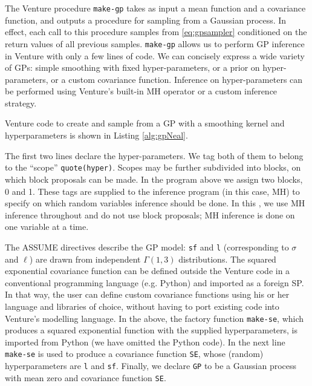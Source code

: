 The Venture procedure \texttt{make-gp} takes as input a mean function and a covariance function, and outputs a procedure for sampling from a Gaussian process.
In effect, each call to this procedure samples from \eqref{eq:gpsampler} conditioned on the return values of all previous samples.
\texttt{make-gp} allows us to perform GP inference in Venture with only a few lines of code.
We can concisely express a wide variety of GPs: simple smoothing with fixed hyper-parameters, or a prior on hyper-parameters, or a custom covariance function.
Inference on hyper-parameters can be performed using Venture's built-in MH operator or a custom inference strategy.

Venture code to create and sample from a GP with a smoothing kernel and hyperparameters is shown in Listing \ref{alg:gpNeal}.




The first two lines declare the hyper-parameters.
We tag both of them to belong to the ``scope'' \texttt{quote(hyper)}.
Scopes may be further subdivided into blocks, on which block proposals can be made. In the program above we assign two blocks, 0 and 1. These tags are supplied to the inference program (in this case, MH) to specify on which random variables inference should be done. In this \paperOrChapter, we use MH inference throughout and do not use block proposals; MH inference is done on one variable at a time.

The ASSUME directives describe the GP model: \texttt{sf} and \texttt{l} (corresponding to $\sigma$ and $\ell$) are drawn from independent $\Gamma(1,3)$ distributions.
The squared exponential covariance function can be defined outside the Venture code in a conventional programming language (e.g. Python) and imported as a foreign SP.
In that way, the user can define custom covariance functions using his or her language and libraries of choice, without having to port existing code into Venture's modelling language.
In the above, the factory function \texttt{make-se}, which produces a squared exponential function with the supplied hyperparameters, is imported from Python (we have omitted the Python code).
In the next line \texttt{make-se} is used to produce a covariance function \texttt{SE}, whose (random) hyperparameters are \texttt{l} and \texttt{sf}.
Finally, we declare \texttt{GP} to be a Gaussian process with mean zero and covariance function \texttt{SE}.






